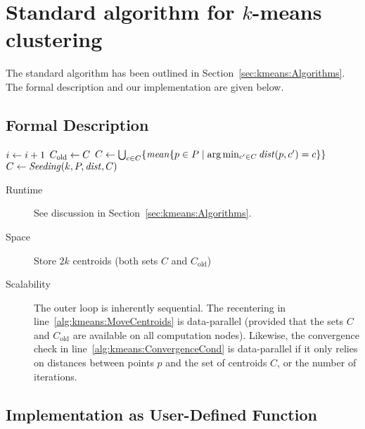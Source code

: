 \section[Standard algorithm for k-means clustering]{Standard algorithm for $k$-means clustering}

The standard algorithm has been outlined in Section~\ref{sec:kmeans:Algorithms}. The formal description and our implementation are given below.

\subsection{Formal Description}

\begin{algorithm} \label{alg:kmeans}
\begin{algorithmic}[1]
	\Repeat
		\State $i \leftarrow i + 1$
		\State $C_\text{old} \leftarrow C$
		\State $C \leftarrow \bigcup_{c \in C} \{ \mathit{mean} \{p \in P \mid \arg\min_{c' \in C} \mathit{dist}(p, c') = c \} \}$ \label{alg:kmeans:MoveCentroids}
		\State $C \leftarrow \mathit{Seeding}(k, P, \mathit{dist}, C)$ \label{alg:kmeans:Reseed} 
	 \label{alg:kmeans:ConvergenceCond}
\end{algorithmic}
\end{algorithm}

\begin{description}
	\item[Runtime] See discussion in Section~\ref{sec:kmeans:Algorithms}.
	\item[Space] Store $2k$ centroids (both sets $C$ and $C_\text{old}$)
	\item[Scalability] The outer loop is inherently sequential. The recentering in line~\ref{alg:kmeans:MoveCentroids} is data-parallel (provided that the sets $C$ and $C_\text{old}$ are available on all computation nodes). Likewise, the convergence check in line~\ref{alg:kmeans:ConvergenceCond} is data-parallel if it only relies on distances between points $p$ and the set of centroids $C$, or the number of iterations.
\end{description}

\subsection{Implementation as User-Defined Function}

